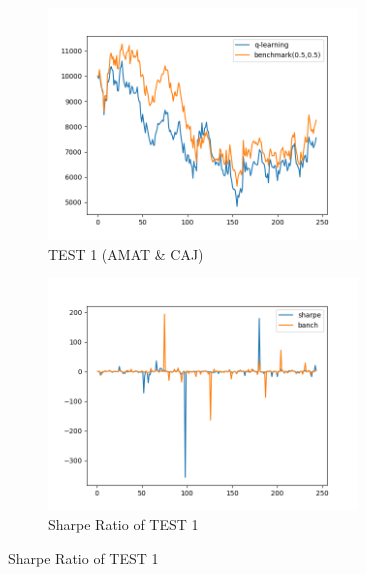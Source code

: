 \begin{figure}[H]
\vspace{0.4cm}
\begin{subfigure}{.5\textwidth}%
\centering
\includegraphics[clip, width=0.9\textwidth]{Graphics/TESTAC10.png} \caption{TEST 1 (AMAT \& CAJ)} 
\end{subfigure}%
\begin{subfigure}{.5\textwidth}%
\centering
\includegraphics[clip, width=0.9\textwidth]{Graphics/TESTAC10S.png} \caption{Sharpe Ratio of TEST 1}
\end{subfigure}%
\end{figure}

